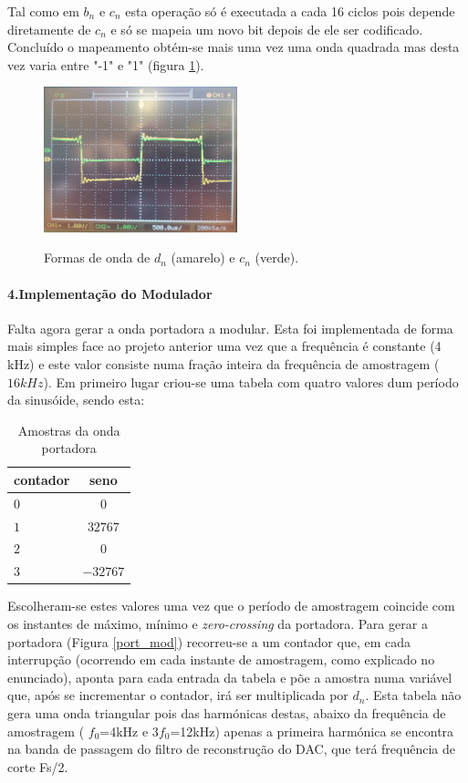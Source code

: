 \documentclass[11pt]{article}
\numberwithin{equation}{section}
\begin{document}
Tal como em $b_n$ e $c_n$ esta operação só é executada a cada 16 ciclos pois depende diretamente de $c_n$ e só se mapeia um novo bit depois de ele ser codificado. Concluído o mapeamento obtém-se mais uma vez uma onda quadrada mas desta vez varia entre "-1" e "1" (figura \ref{cn_dn}).
\begin{figure}[H]
	\centering
	\includegraphics[width=0.5\textwidth]{./cn_dn}~\\
	\caption{Formas de onda de $d_n$ (amarelo) e $c_n$ (verde).}
	\label{cn_dn}
\end{figure}                                                                                                                                     
                                                                              
\paragraph{4.Implementação do Modulador} \hspace{0pt}

Falta agora gerar a onda portadora a modular. Esta foi implementada de forma mais simples face ao projeto anterior uma vez que a frequência é constante (4 kHz) e este valor consiste numa fração inteira da frequência de amostragem ($16 kHz$).
Em primeiro lugar criou-se uma tabela com quatro valores dum período da sinusóide, sendo esta:
\begin{table}[H]
	\centering
	\caption{Amostras da onda portadora}
	\label{tab:amostras}
	\begin{tabular}[c]{|l||c|}
		\hline \textbf{contador} & \textbf{seno}\\ 
		\hline $ 0 $ & $ 0 $\\ 
		\hline $ 1 $ & $ 32767 $  \\ 
		\hline $ 2 $ & $ 0 $ \\ 
		\hline $ 3 $ & $ -32767 $ \\
		\hline
	\end{tabular}
\end{table}
Escolheram-se estes valores uma vez que o período de amostragem coincide com os instantes de máximo, mínimo e \textit{zero-crossing} da portadora. Para gerar a portadora (Figura \ref{port_mod}) recorreu-se a um contador que, em cada interrupção (ocorrendo em cada instante de amostragem, como explicado no enunciado), aponta para cada entrada da tabela e põe a amostra numa variável que, após se incrementar o contador, irá ser multiplicada por $d_n$. Esta tabela não gera uma onda triangular pois das harmónicas destas, abaixo da frequência de amostragem ( $f_0$=4kHz e 3$f_0$=12kHz) apenas a primeira harmónica se encontra na banda de passagem do filtro de reconstrução do DAC, que terá frequência de corte Fs/2.
\end{document}
